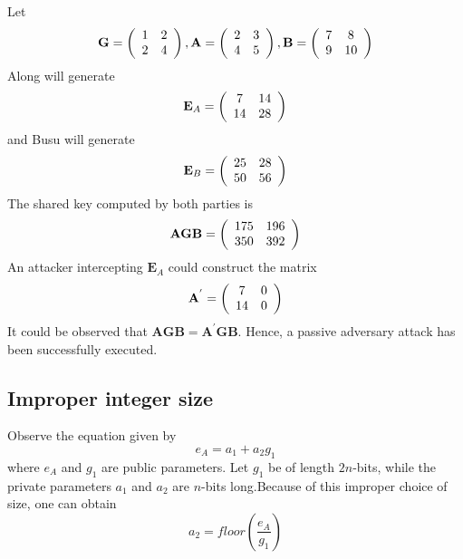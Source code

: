 \documentclass{llncs}
\begin{document}
\begin{example}
Let
\[
\textbf{G}  = \left( {\begin{array}{*{20}c}
   1 & 2   \\
   2 & 4  \\
\end{array}} \right),
\textbf{A} = \left( {\begin{array}{*{20}c}
   2 & 3  \\
   4 & 5  \\
\end{array}} \right),
\textbf{B} = \left( {\begin{array}{*{20}c}
   7 & 8  \\
   9 & 10  \\
\end{array}} \right)
\]
Along will generate
\[
\textbf{E}_{A} = \left( {\begin{array}{*{20}c}
   7 & 14  \\
   14 & 28  \\
\end{array}} \right)
\]
and Busu will generate
\[
\textbf{E}_{B} = \left( {\begin{array}{*{20}c}
   25 & 28  \\
   50 & 56  \\
\end{array}} \right)
\]
The shared key computed by both parties is
\[
\textbf{AGB} = \left( {\begin{array}{*{20}c}
   175 & 196  \\
   350 & 392  \\
\end{array}} \right)
\]
An attacker intercepting $\textbf{E}_{A}$ could construct the
matrix
\[
\textbf{A}^{'} = \left( {\begin{array}{*{20}c}
   7 & 0  \\
   14 & 0  \\
\end{array}} \right)
\]
It could be observed that
$\textbf{AGB}=\textbf{A}^{'}\textbf{GB}$. Hence, a passive
adversary attack has been successfully executed.
\end{example}

\subsection{Improper integer size}
Observe the equation given by
\begin{equation}
e_{A}=a_{1}+a_{2}g_{1}
\end{equation}
where $e_{A}$ and $g_{1}$ are public parameters. Let $g_{1}$ be of
length $2n$-bits, while the private parameters $a_{1}$ and $a_{2}$
are $n$-bits long.Because of this improper choice of size, one can
obtain
\begin{equation}
a_{2}=floor(\frac{e_{A}}{g_{1}})
\end{equation}
\end{document}
